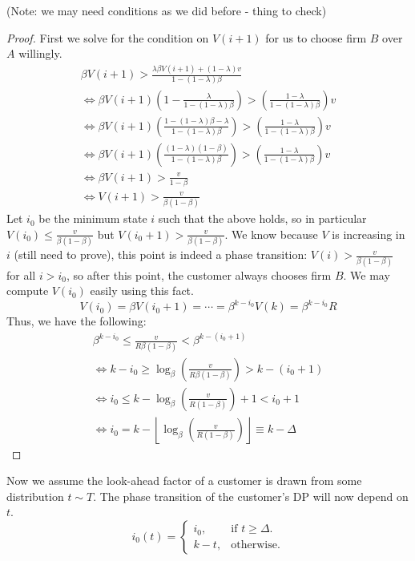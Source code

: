 (Note: we may need conditions as we did before - thing to check)

\begin{proof}
First we solve for the condition on $V(i+1)$ for us to choose firm $B$ over $A$ willingly.
\begin{gather*}
\beta V(i+1) > \frac{\lambda \beta V(i+1) + (1-\lambda)v}{1-(1-\lambda)\beta} \\
\iff \beta V(i+1) \left(1-\frac{\lambda}{1-(1-\lambda)\beta} \right) > \left(\frac{1-\lambda}{1-(1-\lambda)\beta} \right) v \\
\iff \beta V(i+1) \left(\frac{1-(1-\lambda)\beta -\lambda}{1-(1-\lambda)\beta} \right) > \left(\frac{1-\lambda}{1-(1-\lambda)\beta} \right) v \\
\iff \beta V(i+1) \left(\frac{(1-\lambda)(1-\beta)}{1-(1-\lambda)\beta} \right) > \left(\frac{1-\lambda}{1-(1-\lambda)\beta} \right) v \\
\iff \beta V(i+1) > \frac{v}{1-\beta} \\
\iff V(i+1) > \frac{v}{\beta(1-\beta)}
\end{gather*}
Let $i_0$ be the minimum state $i$ such that the above holds, so in particular $V(i_0) \le \frac{v}{\beta(1-\beta)}$ but $V(i_0+1) > \frac{v}{\beta(1-\beta)}$. We know because $V$ is increasing in $i$ (still need to prove), this point is indeed a phase transition: $V(i) > \frac{v}{\beta(1-\beta)}$ for all $i > i_0$, so after this point, the customer always chooses firm $B$. We may compute $V(i_0)$ easily using this fact.
\begin{equation*}
V(i_0) = \beta V(i_0+1) = \cdots = \beta^{k-i_0}V(k) = \beta^{k-i_0}R
\end{equation*}
Thus, we have the following:
\begin{gather*}
\beta^{k-i_0} \le \frac{v}{R\beta(1-\beta)} < \beta^{k-(i_0+1)} \\ 
\iff k-i_0 \ge \log_{\beta}\left(\frac{v}{R\beta(1-\beta)} \right) > k-(i_0+1) \\
\iff i_0 \le k - \log_{\beta}\left(\frac{v}{R(1-\beta)} \right) + 1 < i_0 + 1\\
\iff i_0 = k - \left\lfloor \log_{\beta}\left(\frac{v}{R(1-\beta)}\right) \right\rfloor \equiv k-\Delta
\end{gather*}
\end{proof}

Now we assume the look-ahead factor of a customer is drawn from some distribution $t \sim T$. The phase transition of the customer's DP will now depend on $t$.
\begin{equation*}
  i_0(t)=\begin{cases}
    i_0, & \text{if $t \geq \Delta$}.\\
    k-t, & \text{otherwise}.
  \end{cases}
\end{equation*}

